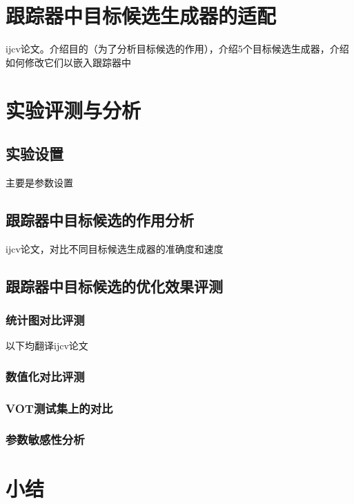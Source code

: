 \section{跟踪器中目标候选生成器的适配}
ijcv论文。介绍目的（为了分析目标候选的作用），介绍5个目标候选生成器，介绍如何修改它们以嵌入跟踪器中




\section{实验评测与分析}
\subsection{实验设置}
主要是参数设置

\subsection{跟踪器中目标候选的作用分析}
ijcv论文，对比不同目标候选生成器的准确度和速度

\subsection{跟踪器中目标候选的优化效果评测}
\subsubsection{统计图对比评测}
以下均翻译ijcv论文
\subsubsection{数值化对比评测}
\subsubsection{VOT测试集上的对比}
\subsubsection{参数敏感性分析}

\section{小结}